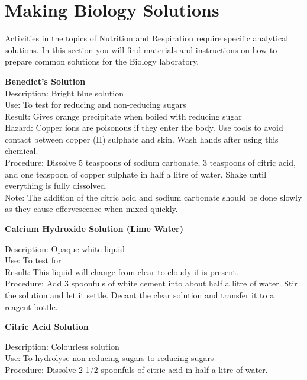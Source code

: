 \chapter{Making Biology Solutions}
Activities in the topics of Nutrition and Respiration require specific analytical solutions. In this section you will find materials and instructions on how to prepare common solutions for the Biology laboratory.


\begin{flushleft}
\textbf{Benedict's Solution}\\
Description: Bright blue solution\\
Use: To test for reducing and non-reducing sugars\\
Result: Gives orange precipitate when boiled with reducing sugar\\
Hazard: Copper ions are poisonous if they enter the body. Use tools to avoid contact between copper (II) sulphate and skin. Wash hands after using this chemical.\\
Procedure: Dissolve 5 teaspoons of sodium carbonate, 3 teaspoons of citric acid,
and one teaspoon of copper sulphate in half a litre of water. Shake until everything is fully dissolved.\\Note: The addition of the citric acid and sodium carbonate should be done slowly as they cause effervescence when mixed quickly.
\end{flushleft}

\begin{flushleft}
\textbf{Calcium Hydroxide Solution (Lime Water)}
\end{flushleft}
\vspace{-6pt}
Description: Opaque white liquid\\
Use: To test for \\
Result: This liquid will change from clear to cloudy if  is present.\\
Procedure: Add 3 spoonfuls of white cement into about half a litre of water. Stir the solution and let it settle. Decant the clear solution and transfer it to a reagent bottle.\\

\begin{flushleft}
\textbf{Citric Acid Solution}
\end{flushleft}
\vspace{-6pt}
Description: Colourless solution\\
Use: To hydrolyse non-reducing sugars to reducing sugars\\
Procedure: Dissolve 2 1/2 spoonfuls of citric acid in half a litre of water.\\


